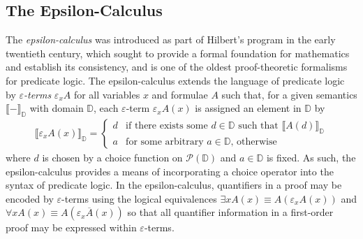 \documentclass[10pt]{article}
\theoremstyle{definition}\newtheorem{remark}[theorem]{Remark}
\theoremstyle{definition}\newtheorem{example}[theorem]{Example}
\theoremstyle{definition}\newtheorem{definition}[theorem]{Definition}
\begin{document}
	\subsection{The Epsilon-Calculus}
	
	The \textit{epsilon-calculus} \cite{HilbertFoundations, ZachFinitism, ZachThesis} was introduced as part of Hilbert's program in the early twentieth century, which sought to provide a formal foundation for mathematics and establish its consistency, and is one of the oldest proof-theoretic formalisms for predicate logic. The epsilon-calculus extends the language of predicate logic by \textit{$\varepsilon$-terms} $\varepsilon_x A$ for all variables $x$ and formulae $A$ such that, for a given semantics $\llbracket - \rrbracket_{\mathbb{D}}$ with domain $\mathbb{D}$, each $\varepsilon$-term $\varepsilon_x A(x)$ is assigned an element in $\mathbb{D}$ by
	\begin{gather*}
		\llbracket \varepsilon_x A(x) \rrbracket_{\mathbb{D}} = \begin{cases}
			d & \text{if there exists some $d \in \mathbb{D}$ such that $\llbracket A(d) \rrbracket_\mathbb{D}$} \\
			a & \text{for some arbitrary $a \in \mathbb{D}$, otherwise}
		\end{cases}
	\end{gather*}
	where $d$ is chosen by a choice function on $\mathcal{P}(\mathbb{D})$ and $a \in \mathbb{D}$ is fixed. As such, the epsilon-calculus provides a means of incorporating a choice operator into the syntax of predicate logic. In the epsilon-calculus, quantifiers in a proof may be encoded by $\varepsilon$-terms using the logical equivalences $\exists x A(x) \equiv A(\varepsilon_x A(x))$ and $\forall x A(x) \equiv A(\varepsilon_x \overline{A}(x))$ so that all quantifier information in a first-order proof may be expressed within $\varepsilon$-terms.
	
\end{document}
